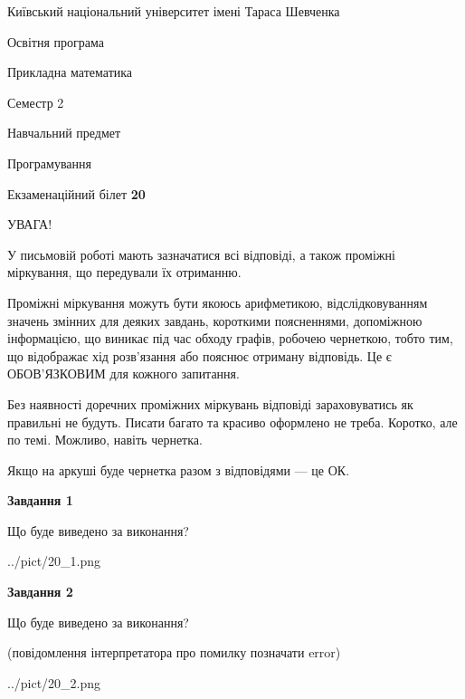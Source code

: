 \documentclass[12pt, ukrainian]{article}
\begin{document}
{{\begin {small}\par
{ \center  Київський національний університет імені Тараса Шевченка \par}
{\parbox {5 cm}{Освітня програма \hfill}{\parbox {7 cm}{Прикладна математика\hfill}}\parbox {6 cm}{\hfill Семестр 2}}\par
{\parbox {5 cm} {Навчальний предмет \hfill}\parbox {7 cm}{Програмування \hfill}\parbox {6cm}{\hfill}\par}\vspace{-7pt} \end{small}}{\center Екзаменаційний білет \No \textbf
{ 20 }\par}}
{
\begin {large}
УВАГА!

У письмовій роботі мають зазначатися всі відповіді, а також проміжні міркування, що передували їх отриманню.

Проміжні міркування можуть бути якоюсь арифметикою, відслідковуванням зна\-чень змінних для деяких завдань,
короткими поясненнями, допоміжною інформацією, що виникає під час обходу графів, робочею чернеткою,
тобто тим, що відображає хід розв’язання або пояснює отриману відповідь.
Це є ОБОВ’ЯЗКОВИМ для кожного запитання.

Без наявності доречних проміжних міркувань відповіді зараховуватись як правиль\-ні не будуть.
Писати багато та красиво оформлено не треба. Коротко, але по темі. Можли\-во, навіть чернетка.

Якщо на аркуші буде чернетка разом з відповідями --- це ОК.

\newpage

{\begin {center}\textbf{Завдання 1}\end {center}}\par
Що буде виведено за виконання?\par
\begin{center}
	{../pict/20_1.png}
\end{center}
\newpage

{\begin {center}\textbf{Завдання 2}\end {center}}\par
Що буде виведено за виконання?\par
 (повідомлення інтерпретатора про помилку позначати error)\par
\begin{center}
	{../pict/20_2.png}
\end{center}
\newpage


\end{large}}
\end{document}
